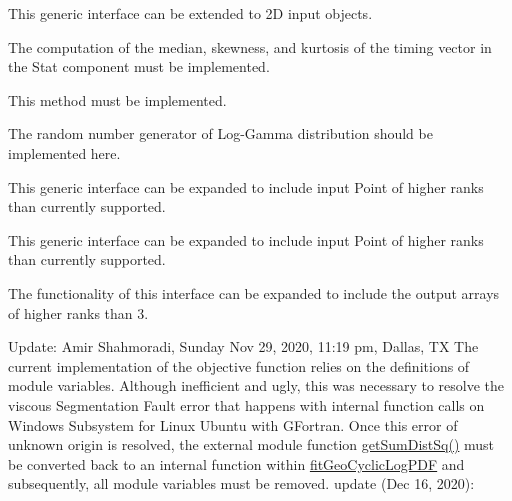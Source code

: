 \begin{DoxyRefList}
\label{todo__todo000024}%
%
 This generic interface can be extended to 2D input objects. ~\newline
 
\item[Subprogram \mbox{\hyperlink{namespaceBench__mod_a614b800597a05c0abca522f81f71769f}{Bench\+\_\+mod\+::time\+Exec}} (Bench, Timing, minsec, miniter)]\label{todo__todo000026}%
%
 The computation of the median, skewness, and kurtosis of the timing vector in the Stat component must be implemented. 
\item[Subprogram \mbox{\hyperlink{namespaceDistMultiNorm__mod_abc50852f3f4a65e6dee14e501df15a60}{Dist\+Multi\+Norm\+\_\+mod\+::logpdf}} (self, Point)]\label{todo__todo000027}%
%
 This method must be implemented. 
\item[Subprogram \mbox{\hyperlink{namespaceDistUniLogGamma__mod_acc6e60c6fa66c784f1f801eb419ecbff}{Dist\+Uni\+Log\+Gamma\+\_\+mod\+::rand}} (self)]\label{todo__todo000028}%
%
 The random number generator of Log-\/\+Gamma distribution should be implemented here.  
\item[Type \mbox{\hyperlink{interfaceDistUniNorm__mod_1_1genNormCDF}{Dist\+Uni\+Norm\+\_\+mod\+::gen\+Norm\+CDF}} ]\label{todo__todo000029}%
%
 This generic interface can be expanded to include input {\ttfamily Point} of higher ranks than currently supported. 
\item[Type \mbox{\hyperlink{interfaceDistUniNorm__mod_1_1genNormLogPDF}{Dist\+Uni\+Norm\+\_\+mod\+::gen\+Norm\+Log\+PDF}} ]\label{todo__todo000030}%
%
 This generic interface can be expanded to include input {\ttfamily Point} of higher ranks than currently supported. 
\item[Type \mbox{\hyperlink{interfaceDistUniNorm__mod_1_1getNormRand}{Dist\+Uni\+Norm\+\_\+mod\+::get\+Norm\+Rand}} ]\label{todo__todo000031}%
%
 The functionality of this interface can be expanded to include the output arrays of higher ranks than 3. 
\item[Subprogram \mbox{\hyperlink{namespaceFitGeoCyclic__mod_a1c31498edcd69664be787f9942aaecea}{Fit\+Geo\+Cyclic\+\_\+mod\+::fit\+Geo\+Cyclic\+Log\+PDF}} (max\+Num\+Trial, num\+Trial, Success\+Step, Log\+Count)]\label{todo__todo000032}%
%
 Update\+: Amir Shahmoradi, Sunday Nov 29, 2020, 11\+:19 pm, Dallas, TX The current implementation of the objective function relies on the definitions of module variables. Although inefficient and ugly, this was necessary to resolve the viscous Segmentation Fault error that happens with internal function calls on Windows Subsystem for Linux Ubuntu with GFortran. Once this error of unknown origin is resolved, the external module function {\ttfamily \mbox{\hyperlink{namespaceFitGeoCyclic__mod_a2bc7f171d922a5311da63e9ea3ad1603}{get\+Sum\+Dist\+Sq()}}} must be converted back to an internal function within \mbox{\hyperlink{namespaceFitGeoCyclic__mod_a1c31498edcd69664be787f9942aaecea}{fit\+Geo\+Cyclic\+Log\+PDF}} and subsequently, all module variables must be removed. update (Dec 16, 2020)\+: ~\newline

\end{DoxyRefList}
